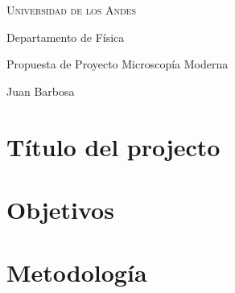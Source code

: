 \documentclass[10pt]{article}
\begin{document}
	{	\centering
		\scshape
		\LARGE
		Universidad de los Andes
		
		\large
		Departamento de F\'isica
		
		\vspace{1cm}
		
		Propuesta de Proyecto Microscop\'ia Moderna
		
		\normalsize
		Juan Barbosa
		
	}
	
	\section{T\'itulo del projecto}
	\section{Objetivos}
	\section{Metodolog\'ia}
\end{document}
